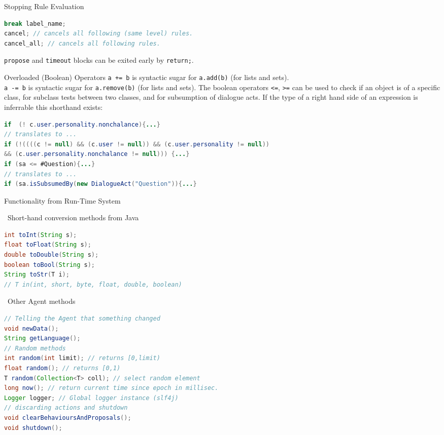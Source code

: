 \documentclass[5pt]{article}
\newcommand{\intitle}[1]{\rule{0pt}{2ex}\ #1}
\begin{document}
\begin{multicols}{2}
\begin{bodybox}{Stopping Rule Evaluation}
\begin{lstlisting}[language=Java]
break label_name;
cancel; // cancels all following (same level) rules.
cancel_all; // cancels all following rules.
            \end{lstlisting}
            \verb|propose| and \verb|timeout| blocks can be exited early by \verb|return;|.
        \end{bodybox}
        \begin{bodybox}{Overloaded (Boolean) Operators}
            \verb|a += b| is syntactic sugar for \verb|a.add(b)| (for lists and sets).\\
            \verb|a -= b| is syntactic sugar for \verb|a.remove(b)| (for lists and sets).
        The boolean operators \verb|<=|, \verb|>=| can be used to check if an object is of a specific class, for subclass tests between two classes, and for subsumption of dialogue acts.
        If the type of a right hand side of an expression is inferrable this shorthand exists:
        \begin{lstlisting}[language=Java]
if  (! c.user.personality.nonchalance){...}
// translates to ...
if (!((((c != null) && (c.user != null)) && (c.user.personality != null))
&& (c.user.personality.nonchalance != null))) {...}
if (sa <= #Question){...}
// translates to ...
if (sa.isSubsumedBy(new DialogueAct("Question")){...}
        \end{lstlisting}
        \end{bodybox}
        \begin{bodybox}{Functionality from Run-Time System}
        \intitle{Short-hand conversion methods from Java}
        \begin{lstlisting}[language=Java]
int toInt(String s);
float toFloat(String s);
double toDouble(String s);
boolean toBool(String s);
String toStr(T i);
// T in(int, short, byte, float, double, boolean)
        \end{lstlisting}
        \intitle{Other Agent methods}
        \begin{lstlisting}[language=Java]
// Telling the Agent that something changed
void newData();
String getLanguage();
// Random methods
int random(int limit); // returns [0,limit)
float random(); // returns [0,1)
T random(Collection<T> coll); // select random element
long now(); // return current time since epoch in millisec.
Logger logger; // Global logger instance (slf4j)
// discarding actions and shutdown
void clearBehavioursAndProposals();
void shutdown();
        \end{lstlisting}
        \end{bodybox}
        \begin{bodybox}{}

\end{bodybox}
\end{multicols}
\end{document}
